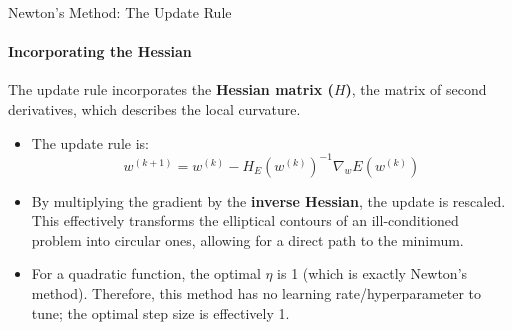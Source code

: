 \begin{frame}{Newton's Method: The Update Rule}
    \framesubtitle{Incorporating the Hessian}
    The update rule incorporates the \textbf{Hessian matrix ($H$)}, the matrix of second derivatives, which describes the local curvature.
    \begin{itemize}
        \item The update rule is:
            $$ w^{(k+1)} = w^{(k)} - H_{E}(w^{(k)})^{-1} \nabla_{w}E(w^{(k)}) $$
        \item By multiplying the gradient by the \textbf{inverse Hessian}, the update is rescaled. This effectively transforms the elliptical contours of an ill-conditioned problem into circular ones, allowing for a direct path to the minimum.
        \item For a quadratic function, the optimal $\eta$ is 1 (which is exactly Newton's method). Therefore, this method has no learning rate/hyperparameter to tune; the optimal step size is effectively 1.
    \end{itemize}
\end{frame}



